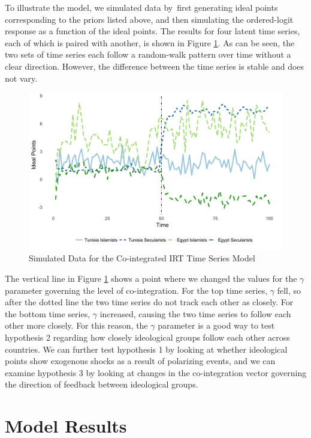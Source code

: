 \documentclass[12pt]{article}
\begin{document}
 To illustrate the model, we simulated data by first generating ideal points corresponding to the priors listed above, and then simulating the ordered-logit response as a function of the ideal points. The results for four latent time series, each of which is paired with another, is shown in Figure \ref{sim_data}. As can be seen, the two sets of time series each follow a random-walk pattern over time without a clear direction. However, the difference between the time series is stable and does not vary. 
 \begin{figure}[!h]
 	\caption{Simulated Data for the Co-integrated IRT Time Series Model}\label{sim_data}
 	\centering
 	\includegraphics[width=.9\linewidth]{ecm_example.png}
 \end{figure}

The vertical line in Figure \ref{sim_data} shows a point where we changed the values for the $\gamma$ parameter governing the level of co-integration. For the top time series, $\gamma$ fell, so after the dotted line the two time series do not track each other as closely. For the bottom time series, $\gamma$ increased, causing the two time series to follow each other more closely. For this reason, the $\gamma$ parameter is a good way to test hypothesis 2 regarding how closely ideological groups follow each other across countries. We can further test hypothesis 1 by looking at whether ideological points show exogenous shocks as a result of polarizing events, and we can examine hypothesis 3 by looking at changes in the co-integration vector governing the direction of feedback between ideological groups.

\section*{Model Results}
\end{document}
